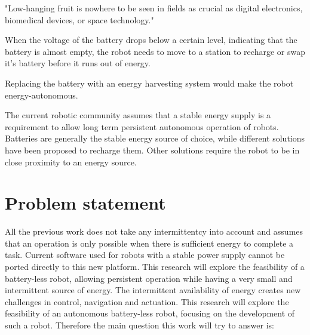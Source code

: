 "Low-hanging fruit is nowhere to be seen in fields as crucial as digital electronics, biomedical devices, or space technology."
\cite{zachary_spec_2016}





When the voltage of the battery drops below a certain level, indicating that the battery is almost empty, the robot needs to move to a station to recharge or swap it's battery before it runs out of energy.

Replacing the battery with an energy harvesting system would make the robot energy-autonomous. 


The current robotic community assumes that a stable energy supply is a requirement to allow long term persistent autonomous operation of robots.
Batteries are generally the stable energy source of choice, while different solutions have been proposed to recharge them.
Other solutions require the robot to be in close proximity to an energy source.








\section{Problem statement}


All the previous work does not take any intermittentcy into account and assumes that an operation is only possible when there is sufficient energy to complete a task.
Current software used for robots with a stable power supply cannot be ported directly to this new platform.
This research will explore the feasibility of a battery-less robot, allowing persistent operation while having a very small and intermittent source of energy.
The intermittent availability of energy creates new challenges in control, navigation and actuation. 
This research will explore the feasibility of an autonomous battery-less robot, focusing on the development of such a robot. Therefore the main question this work will try to answer is:

